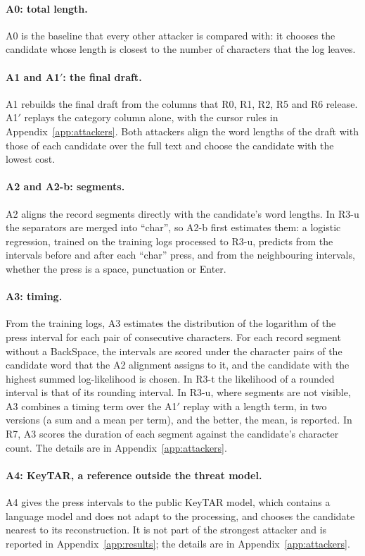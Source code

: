 \paragraph{A0: total length.}
A0 is the baseline that every other attacker is compared with: it chooses the candidate whose length is closest to
the number of characters that the log leaves.

\paragraph{A1 and A1$'$: the final draft.}
A1 rebuilds the final draft from the columns that R0, R1, R2, R5 and R6 release. A1$'$ replays the category column alone,
with the cursor rules in Appendix~\ref{app:attackers}. Both attackers align the word lengths of the
draft with those of each candidate over the full text and choose the candidate with the lowest cost.

\paragraph{A2 and A2-b: segments.}
A2 aligns the record segments directly with the candidate's word lengths. In R3-u the separators are merged into
``char'', so A2-b first estimates them: a logistic regression, trained on the training logs processed to R3-u,
predicts from the intervals before and after each ``char'' press, and from the neighbouring intervals, whether the
press is a space, punctuation or Enter.

\paragraph{A3: timing.}
From the training logs, A3 estimates the distribution of the logarithm of the press interval for each pair of
consecutive characters. For each record segment without a BackSpace, the intervals are scored under the character pairs
of the candidate word that the A2 alignment assigns to it, and the candidate with the highest summed log-likelihood is
chosen. In R3-t the likelihood of a rounded interval is that of its rounding interval. In R3-u, where segments are not
visible, A3 combines a timing term over the A1$'$ replay with a length term, in two versions (a sum and a mean per
term), and the better, the mean, is reported. In R7, A3 scores the duration of each segment against the candidate's
character count. The details are in Appendix~\ref{app:attackers}.

\paragraph{A4: KeyTAR, a reference outside the threat model.}
A4 gives the press intervals to the public KeyTAR model, which contains a language model and does not adapt to the
processing, and chooses the candidate nearest to its reconstruction. It is not part of the strongest attacker and is
reported in Appendix~\ref{app:results}; the details are in Appendix~\ref{app:attackers}.

